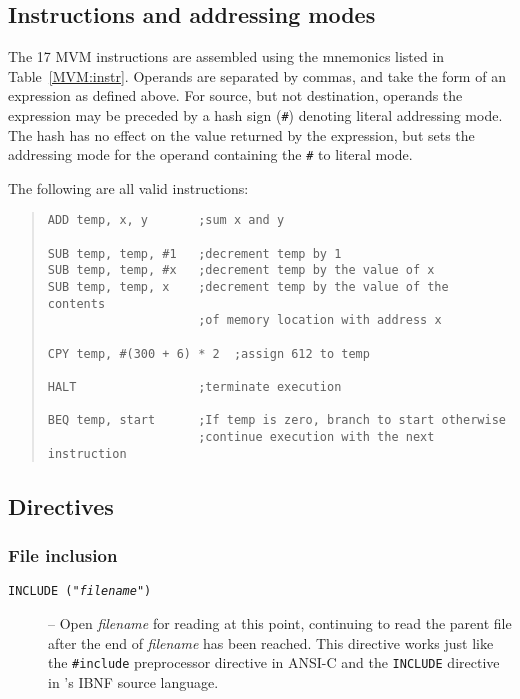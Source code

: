 \subsection{Instructions and addressing modes}
The 17 MVM instructions are assembled using the mnemonics listed in
Table~\ref{MVM:instr}. Operands are separated by commas, and take
the form of an expression as defined above. For source, but not
destination, operands the expression may be preceded by a hash sign (\verb+#+)
denoting literal addressing mode. The hash has no effect on the value
returned by the expression, but sets the addressing mode for the
operand containing the \verb+#+ to literal mode.

The following are all valid instructions:
\begin{quote}
\small
\begin{verbatim}
ADD temp, x, y       ;sum x and y

SUB temp, temp, #1   ;decrement temp by 1
SUB temp, temp, #x   ;decrement temp by the value of x
SUB temp, temp, x    ;decrement temp by the value of the contents 
                     ;of memory location with address x

CPY temp, #(300 + 6) * 2  ;assign 612 to temp

HALT                 ;terminate execution

BEQ temp, start      ;If temp is zero, branch to start otherwise
                     ;continue execution with the next instruction
\end{verbatim}
\end{quote}


\subsection{Directives}
\label{mvmasm:directives}

\subsubsection{File inclusion}
\begin{description}
\item[{\tt INCLUDE ("{\em filename}")}]
--
Open {\em filename} for reading at
this point, continuing to read the parent file after the end of {\em
filename} has been reached. This directive works just like the
\verb+#include+ preprocessor directive in ANSI-C and the \verb+INCLUDE+ directive
in \rdp's IBNF source language.
\end{description}

